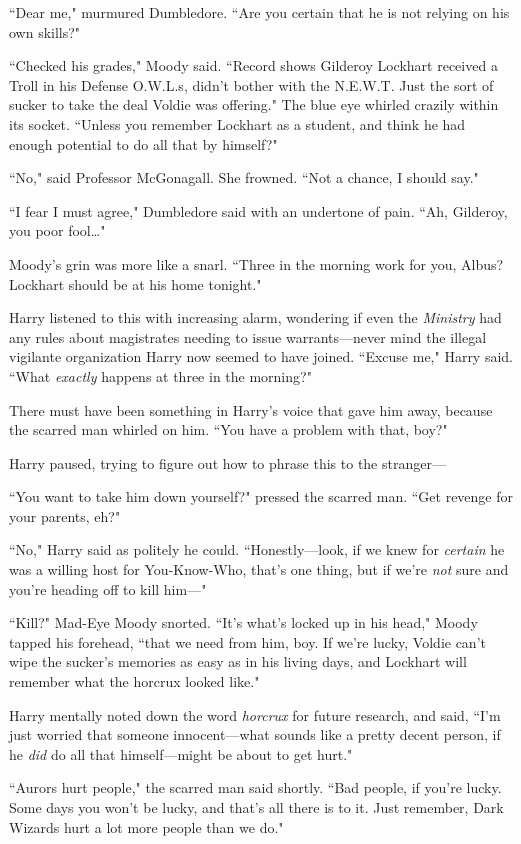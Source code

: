 ``Dear me," murmured Dumbledore. ``Are you certain that he is not relying on his own skills?"

``Checked his grades," Moody said. ``Record shows Gilderoy Lockhart received a Troll in his Defense O.W.L.s, didn't bother with the N.E.W.T. Just the sort of sucker to take the deal Voldie was offering." The blue eye whirled crazily within its socket. ``Unless you remember Lockhart as a student, and think he had enough potential to do all that by himself?"

``No," said Professor McGonagall. She frowned. ``Not a chance, I should say."

``I fear I must agree," Dumbledore said with an undertone of pain. ``Ah, Gilderoy, you poor fool{\ldots}"

Moody's grin was more like a snarl. ``Three in the morning work for you, Albus? Lockhart should be at his home tonight."

Harry listened to this with increasing alarm, wondering if even the \emph{Ministry} had any rules about magistrates needing to issue warrants—never mind the illegal vigilante organization Harry now seemed to have joined. ``Excuse me," Harry said. ``What \emph{exactly} happens at three in the morning?"

There must have been something in Harry's voice that gave him away, because the scarred man whirled on him. ``You have a problem with that, boy?"

Harry paused, trying to figure out how to phrase this to the stranger—

``You want to take him down yourself?" pressed the scarred man. ``Get revenge for your parents, eh?"

``No," Harry said as politely he could. ``Honestly—look, if we knew for \emph{certain} he was a willing host for You-Know-Who, that's one thing, but if we're \emph{not} sure and you're heading off to kill him—"

``Kill?" Mad-Eye Moody snorted. ``It's what's locked up in his head," Moody tapped his forehead, ``that we need from him, boy. If we're lucky, Voldie can't wipe the sucker's memories as easy as in his living days, and Lockhart will remember what the horcrux looked like."

Harry mentally noted down the word \emph{horcrux} for future research, and said, ``I'm just worried that someone innocent—what sounds like a pretty decent person, if he \emph{did} do all that himself—might be about to get hurt."

``Aurors hurt people," the scarred man said shortly. ``Bad people, if you're lucky. Some days you won't be lucky, and that's all there is to it. Just remember, Dark Wizards hurt a lot more people than we do."

